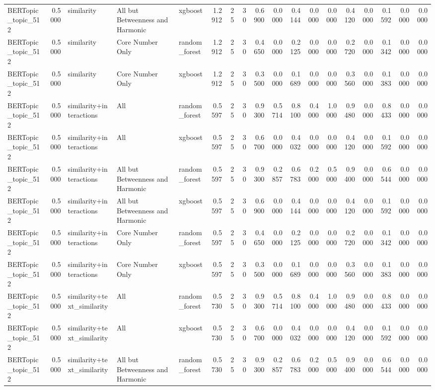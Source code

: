 \begin{tabular}{lrlllrrrrrrrrrrrrr}
BERTopic_topic_512 & 0.5000 & similarity & All but Betweenness and Harmonic & xgboost & 1.2912 & 25 & 30 & 0.6900 & 0.0000 & 0.4144 & 0.0000 & 0.0000 & 0.4120 & 0.0000 & 0.1592 & 0.0000 & 0.0000 \\
BERTopic_topic_512 & 0.5000 & similarity & Core Number Only & random_forest & 1.2912 & 25 & 30 & 0.4650 & 0.0000 & 0.2125 & 0.0000 & 0.0000 & 0.2720 & 0.0000 & 0.1342 & 0.0000 & 0.0000 \\
BERTopic_topic_512 & 0.5000 & similarity & Core Number Only & xgboost & 1.2912 & 25 & 30 & 0.3500 & 0.0000 & 0.1689 & 0.0000 & 0.0000 & 0.3560 & 0.0000 & 0.1383 & 0.0000 & 0.0000 \\
BERTopic_topic_512 & 0.5000 & similarity+interactions & All & random_forest & 0.5597 & 25 & 30 & 0.9300 & 0.5714 & 0.8100 & 0.4000 & 1.0000 & 0.9480 & 0.0000 & 0.8433 & 0.0000 & 0.0000 \\
BERTopic_topic_512 & 0.5000 & similarity+interactions & All & xgboost & 0.5597 & 25 & 30 & 0.6700 & 0.0000 & 0.4032 & 0.0000 & 0.0000 & 0.4120 & 0.0000 & 0.1592 & 0.0000 & 0.0000 \\
BERTopic_topic_512 & 0.5000 & similarity+interactions & All but Betweenness and Harmonic & random_forest & 0.5597 & 25 & 30 & 0.9300 & 0.2857 & 0.6783 & 0.2000 & 0.5000 & 0.9400 & 0.0000 & 0.6544 & 0.0000 & 0.0000 \\
BERTopic_topic_512 & 0.5000 & similarity+interactions & All but Betweenness and Harmonic & xgboost & 0.5597 & 25 & 30 & 0.6900 & 0.0000 & 0.4144 & 0.0000 & 0.0000 & 0.4120 & 0.0000 & 0.1592 & 0.0000 & 0.0000 \\
BERTopic_topic_512 & 0.5000 & similarity+interactions & Core Number Only & random_forest & 0.5597 & 25 & 30 & 0.4650 & 0.0000 & 0.2125 & 0.0000 & 0.0000 & 0.2720 & 0.0000 & 0.1342 & 0.0000 & 0.0000 \\
BERTopic_topic_512 & 0.5000 & similarity+interactions & Core Number Only & xgboost & 0.5597 & 25 & 30 & 0.3500 & 0.0000 & 0.1689 & 0.0000 & 0.0000 & 0.3560 & 0.0000 & 0.1383 & 0.0000 & 0.0000 \\
BERTopic_topic_512 & 0.5000 & similarity+text_similarity & All & random_forest & 0.5730 & 25 & 30 & 0.9300 & 0.5714 & 0.8100 & 0.4000 & 1.0000 & 0.9480 & 0.0000 & 0.8433 & 0.0000 & 0.0000 \\
BERTopic_topic_512 & 0.5000 & similarity+text_similarity & All & xgboost & 0.5730 & 25 & 30 & 0.6700 & 0.0000 & 0.4032 & 0.0000 & 0.0000 & 0.4120 & 0.0000 & 0.1592 & 0.0000 & 0.0000 \\
BERTopic_topic_512 & 0.5000 & similarity+text_similarity & All but Betweenness and Harmonic & random_forest & 0.5730 & 25 & 30 & 0.9300 & 0.2857 & 0.6783 & 0.2000 & 0.5000 & 0.9400 & 0.0000 & 0.6544 & 0.0000 & 0.0000 \\

\end{tabular}
